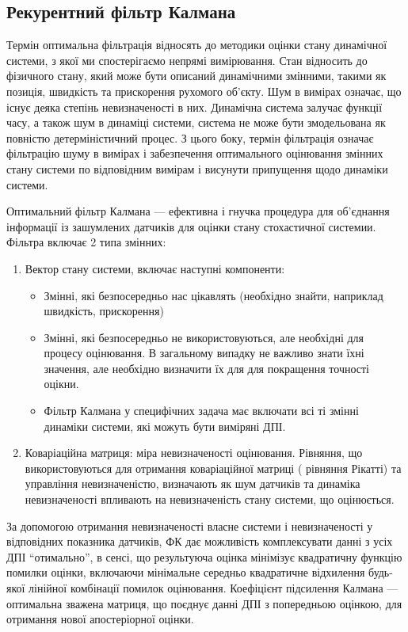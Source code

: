 \subsection{Рекурентний фільтр Калмана}

Термін оптимальна фільтрація відносять до методики оцінки стану динамічної системи, з якої ми 
спостерігаємо непрямі вимірювання. Стан відносить до фізичного стану, який може бути описаний 
динамічними змінними, такими як позиція, швидкість та прискорення рухомого об'єкту. Шум в вимірах 
означає, що  існує деяка  степінь невизначеності в них. Динамічна система залучає функції часу, 
а також шум в динаміці системи,  система не може бути змодельована як повністю детерміністичний 
процес. З цього боку, термін фільтрація  означає фільтрацію шуму в вимірах і забезпечення 
оптимального оцінювання змінних стану системи по відповідним вимірам і висунути припущення 
щодо динаміки системи.

Оптимальний фільтр Калмана \cite{bib:kalman_1} — ефективна і гнучка процедура для об'єднання інформації із зашумлених 
датчиків для оцінки стану стохастичної системии.
Фільтра включає 2 типа змінних:
\begin{enumerate}
 \item Вектор стану системи, включає наступні компоненти:
  \begin{itemize}
    \item Змінні, які безпосередньо нас цікавлять (необхідно знайти, наприклад швидкість, прискорення)
    \item Змінні, які безпосередньо не використовуються, але необхідні для процесу оцінювання. 
    В загальному випадку не важливо знати їхні значення, але необхідно визначити їх для для 
    покращення точності оцікни.
    \item Фільтр Калмана у специфічних задача має включати всі ті змінні динаміки системи, які можуть 
    бути виміряні ДПІ.
    \end{itemize}
 \item Коваріаційна матриця: міра невизначеності оцінювання. Рівняння, що використовуються для 
отримання коваріаційної матриці ( рівняння Рікатті) та управління невизначеністю, визначають 
як шум датчиків та динаміка невизначеності впливають на невизначеність стану системи, що оцінюється.
\end{enumerate}

За допомогою отримання невизначеності власне системи і невизначеності у відповідних 
показника датчиків, ФК дає можливість комплексувати данні з усіх ДПІ “отимально”, в 
сенсі, що результуюча оцінка мінімізує квадратичну функцію помилки оцінки, включаючи 
мінімальне середньо квадратичне відхилення будь-якої лінійної комбінації помилок оцінювання. 
Коефіцієнт підсилення Калмана — оптимальна зважена матриця, що поєднує данні ДПІ з попередньою 
оцінкою, для отримання нової апостеріорної оцінки.


